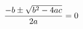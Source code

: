 \documentclass[preview]{standalone}
\begin{document}
\begin{align*}
\special{dvisvgm:raw <g id='unique000'>}\frac{-b \pm \sqrt{b^2 - 4ac}}{2a}=0\special{dvisvgm:raw </g>}
\end{align*}
\end{document}
